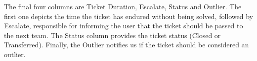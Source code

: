 The final four columns are Ticket Duration, Escalate, Status and Outlier. The first one depicts the time the ticket has endured without being solved, followed by Escalate, responsible for informing the user that the ticket should be passed to the next team. The Status column provides the ticket status (Closed or Transferred). Finally, the Outlier notifies us if the ticket should be considered an outlier.